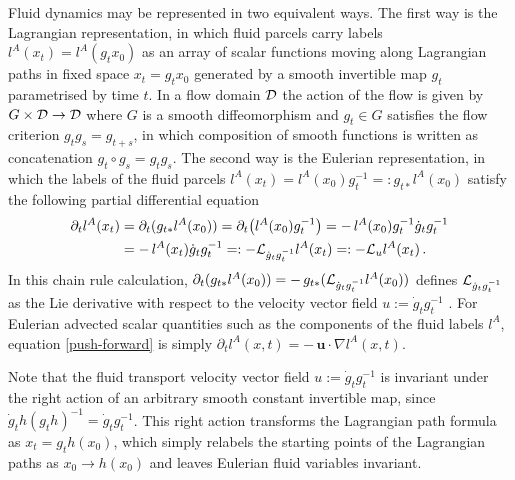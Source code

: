 \documentclass[11pt, oneside]{article}   	%
\numberwithin{equation}{section}
\theoremstyle{plain}
\theoremstyle{definition}
\theoremstyle{remark}
\newcommand{\<}{\langle}
\renewcommand{\>}{\rangle}
\def\p{{\partial}}
\def\bu{\mathbf{u}}
\begin{document}
Fluid dynamics may be represented in two equivalent ways. The first way is the Lagrangian representation, in which fluid parcels carry labels $l^A(x_t) = l^A(g_t x_0)$ as an array of scalar functions moving along Lagrangian paths in fixed space $x_t=g_t x_0$ generated by a smooth invertible map $g_t$ parametrised by time $t$. In a flow domain  ${\cal D}$ the action of the flow is given by $G\times{\cal D}\to {\cal D}$ where $G$ is a smooth diffeomorphism and $g_t\in G$ satisfies the flow criterion $g_tg_s = g_{t+s}$, in which composition of smooth functions is written as concatenation $g_t\circ g_s=g_tg_s$.  The second way is the Eulerian representation, in which the labels of the fluid parcels  $l^A(x_t)=l^A(x_0) g_t^{-1}=: g_{t*} l^A(x_0)$ satisfy the following partial differential equation 
 
  
  
\begin{align}
\begin{split}
\p_t l^A(x_t) &= \p_t (g_{t*} l^A(x_0)) = \p_t \big(l^A(x_0) g_t^{-1}\big) 
= -  \, l^A(x_0) g_t^{-1}\dot{g}_t  g_t^{-1}  
\\& = -\, l^A(x_t) \dot{g}_t  g_t^{-1}
=: - {\cal L}_{ \dot{g}_t  g_t^{-1} } l^A(x_t) =: - {\cal L}_{u } l^A(x_t) 
\,.\end{split}
\label{push-forward}
\end{align}
In this chain rule calculation, $\p_t (g_{t*} l^A(x_0)) = - \,g_{t*} ( {\cal L}_{ \dot{g}_t  g_t^{-1} } l^A(x_0) ) $ defines  ${\cal L}_{ \dot{g}_t  g_t^{-1} }$ as the Lie derivative with respect to the velocity vector field $u := \dot{g}_t  g_t^{-1}$ \cite{holm1998euler,cotter2013noether}. For Eulerian advected scalar quantities such as the components of the fluid labels $l^A$, equation \eqref{push-forward} is simply $\p_t l^A(x,t) = - \, \bu\cdot\nabla l^A(x,t)$. 

Note that the fluid transport velocity vector field $u := \dot{g}_t  g_t^{-1} $ is invariant under the right action of an arbitrary smooth constant invertible map, since $ \dot{g}_t h (g_t h)^{-1}= \dot{g}_t  g_t^{-1}$. This right action transforms the Lagrangian path formula as $x_t =g_t h (x_0)$, which simply relabels the starting points of the Lagrangian paths as $x_0\to h (x_0)$ and leaves Eulerian fluid variables invariant.
\end{document}
